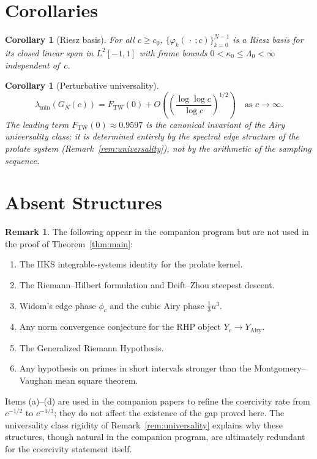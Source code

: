 \documentclass[12pt,a4paper]{amsart}
\newtheorem{corollary}[theorem]{Corollary}
\theoremstyle{definition}
\newtheorem{remark}[theorem]{Remark}
\newcommand{\GN}{G_N(c)}
\newcommand{\FTW}{F_{\mathrm{TW}}(0)}
\begin{document}
\section{Corollaries}
\label{sec:corollaries}

\begin{corollary}[Riesz basis]\label{cor:riesz}
For all $c \ge c_0$, $\{\varphi_k(\,\cdot\,;c)\}_{k=0}^{N-1}$
is a Riesz basis for its closed linear span in $L^2[-1,1]$
with frame bounds $0 < \kappa_0 \le \Lambda_0 < \infty$ independent of~$c$.
\end{corollary}

\begin{corollary}[Perturbative universality]\label{cor:universality}
\begin{equation}\label{eq:universality}
  \lambda_{\min}(\GN)
  = \FTW + O\!\left(\left(\frac{\log\log c}{\log c}\right)^{1/2}\right)
  \quad\text{as }c\to\infty.
\end{equation}
The leading term $\FTW \approx 0.9597$ is the canonical invariant of
the Airy universality class; it is determined entirely by the
spectral edge structure of the prolate system
(Remark~\ref{rem:universality}), not by the arithmetic of the
sampling sequence.
\end{corollary}

\section{Absent Structures}\label{sec:notuse}

\begin{remark}
The following appear in the companion program but are not used in the
proof of Theorem~\ref{thm:main}:
\begin{enumerate}[\rm (a)]
  \item The IIKS integrable-systems identity for the prolate kernel.
  \item The Riemann--Hilbert formulation and Deift--Zhou steepest descent.
  \item Widom's edge phase $\phi_c$ and the cubic Airy phase $\tfrac{1}{3}u^3$.
  \item Any norm convergence conjecture for the RHP object $Y_c \to Y_{\mathrm{Airy}}$.
  \item The Generalized Riemann Hypothesis.
  \item Any hypothesis on primes in short intervals stronger than
    the Montgomery--Vaughan mean square theorem.
\end{enumerate}
Items (a)--(d) are used in the companion papers to refine the
coercivity rate from $c^{-1/2}$ to $c^{-1/3}$;
they do not affect the existence of the gap proved here.
The universality class rigidity of Remark~\ref{rem:universality}
explains why these structures, though natural in the companion program,
are ultimately redundant for the coercivity statement itself.
\end{remark}
\end{document}
